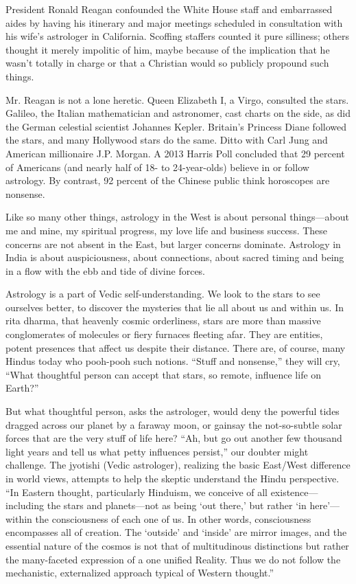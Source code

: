  

President Ronald Reagan confounded the White House staff and embarrassed aides by having his itinerary and major meetings scheduled in consultation with his wife’s astrologer in California. Scoffing staffers counted it pure silliness; others thought it merely impolitic of him, maybe because of the implication that he wasn’t totally in charge or that a Christian would so publicly propound such things.

 

Mr. Reagan is not a lone heretic. Queen Elizabeth I, a Virgo, consulted the stars. Galileo, the Italian mathematician and astronomer, cast charts on the side, as did the German celestial scientist Johannes Kepler. Britain’s Princess Diane followed the stars, and many Hollywood stars do the same. Ditto with Carl Jung and American millionaire J.P. Morgan. A 2013 Harris Poll concluded that 29 percent of Americans (and nearly half of 18- to 24-year-olds) believe in or follow astrology. By contrast, 92 percent of the Chinese public think horoscopes are nonsense.

 

Like so many other things, astrology in the West is about personal things—about me and mine, my spiritual progress, my love life and business success. These concerns are not absent in the East, but larger concerns dominate. Astrology in India is about auspiciousness, about connections, about sacred timing and being in a flow with the ebb and tide of divine forces.

 

Astrology is a part of Vedic self-understanding. We look to the stars to see ourselves better, to discover the mysteries that lie all about us and within us. In rita dharma, that heavenly cosmic orderliness, stars are more than massive conglomerates of molecules or fiery furnaces fleeting afar. They are entities, potent presences that affect us despite their distance. There are, of course, many Hindus today who pooh-pooh such notions. “Stuff and nonsense,” they will cry, “What thoughtful person can accept that stars, so remote, influence life on Earth?”

 

But what thoughtful person, asks the astrologer, would deny the powerful tides dragged across our planet by a faraway moon, or gainsay the not-so-subtle solar forces that are the very stuff of life here? “Ah, but go out another few thousand light years and tell us what petty influences persist,” our doubter might challenge. The jyotishi (Vedic astrologer), realizing the basic East/West difference in world views, attempts to help the skeptic understand the Hindu perspective. “In Eastern thought, particularly Hinduism, we conceive of all existence—including the stars and planets—not as being ‘out there,’ but rather ‘in here’—within the consciousness of each one of us. In other words, consciousness encompasses all of creation. The ‘outside’ and ‘inside’ are mirror images, and the essential nature of the cosmos is not that of multitudinous distinctions but rather the many-faceted expression of a one unified Reality. Thus we do not follow the mechanistic, externalized approach typical of Western thought.”

